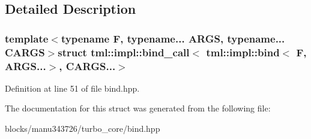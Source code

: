 \subsection{Detailed Description}
\subsubsection*{template$<$typename F, typename... A\+R\+G\+S, typename... C\+A\+R\+G\+S$>$struct tml\+::impl\+::bind\+\_\+call$<$ tml\+::impl\+::bind$<$ F, A\+R\+G\+S...$>$, C\+A\+R\+G\+S...$>$}



Definition at line 51 of file bind.\+hpp.



The documentation for this struct was generated from the following file\+:\begin{DoxyCompactItemize}
\item 
blocks/manu343726/turbo\+\_\+core/bind.\+hpp\end{DoxyCompactItemize}
